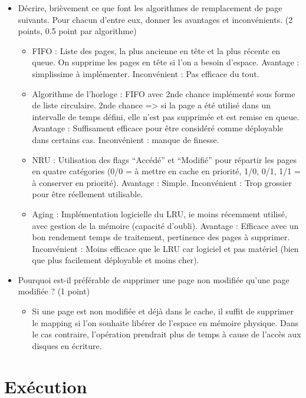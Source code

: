 \begin{correction}
\begin{itemize}
   \item Décrire, brièvement ce que font les algorithmes de remplacement de page suivants. Pour chacun d'entre eux, donner les avantages et inconvénients. (2 points, 0.5 point par algorithme)
         \begin{itemize}
            \item FIFO : Liste des pages, la plus ancienne en tête et la plus récente en queue. On supprime les pages en tête si l'on a besoin d'espace. Avantage : simplissime à implémenter. Inconvénient : Pas efficace du tout.
            \item Algorithme de l'horloge : FIFO avec 2nde chance implémenté sous forme de liste circulaire. 2nde chance => si la page a été utilisé dans un intervalle de temps défini, elle n'est pas supprimée et est remise en queue. Avantage : Suffisament efficace pour être considéré comme déployable dans certains cas. Inconvénient : manque de finesse.
            \item NRU : Utilisation des flags ``Accédé'' et ``Modifié'' pour répartir les pages en quatre catégories (0/0 = à mettre en cache en priorité, 1/0, 0/1, 1/1 = à conserver en priorité). Avantage : Simple. Inconvénient : Trop grossier pour être réellement utilisable.
            \item Aging : Implémentation logicielle du LRU, ie moins récemment utilisé, avec gestion de la mémoire (capacité d'oubli). Avantage : Efficace avec un bon rendement temps de traitement, pertinence des pages à supprimer. Inconvénient : Moins efficace que le LRU car logiciel et pas matériel (bien que plus facilement déployable et moins cher).
         \end{itemize}
   \item Pourquoi est-il préférable de supprimer une page non modifiée qu'une page modifiée ? (1 point)
   \begin{itemize}
        \item Si une page est non modifiée et déjà dans le cache, il suffit de supprimer le mapping si l'on souhaite libérer de l'espace en mémoire physique. Dans le cas contraire, l'opération prendrait plus de temps à cause de l'accès aux disques en écriture.
   \end{itemize}
\end{itemize}


\end{correction}

%
%

\section{Ex\'ecution
         {\hfill{} }}


